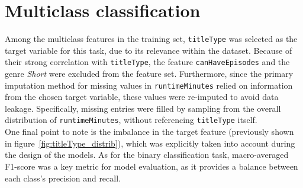 




\section{Multiclass classification}\label{sec:multiclass_classification}
Among the multiclass features in the training set, \texttt{titleType} was selected as the target variable
for this task, due to its relevance within the dataset. Because of their strong correlation with
\texttt{titleType}, the feature \texttt{canHaveEpisodes} and the genre \textit{Short} were excluded from the
feature set. Furthermore, since the primary imputation method for missing values in \texttt{runtimeMinutes}
relied on information from the chosen target variable, these values were re-imputed to avoid data leakage.
Specifically, missing entries were filled by sampling from the overall distribution of
\texttt{runtimeMinutes}, without referencing \texttt{titleType} itself.\\

One final point to note is the imbalance in the target feature (previously shown in
figure~\ref{fig:titleType_distrib}), which was explicitly taken into account
during the design of the models. As for the binary classification task, macro-averaged F1-score was
a key metric for model evaluation, as it provides a balance between each class's precision and recall.




